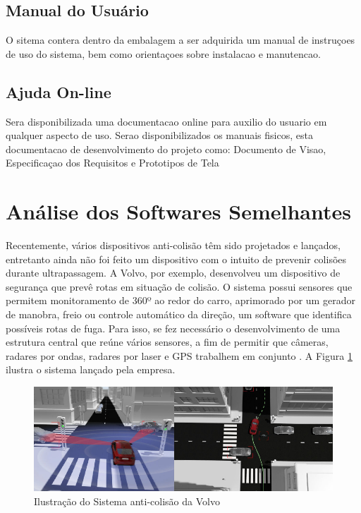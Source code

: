 \subsection{Manual do Usuário}
O sitema contera dentro da embalagem a ser adquirida um manual de instruçoes de uso do sistema, bem como orientaçoes sobre instalacao e manutencao.

\subsection{Ajuda On-line}
Sera disponibilizada uma documentacao online para auxilio do usuario em qualquer aspecto de uso. Serao disponibilizados os manuais fisicos, esta documentacao de desenvolvimento do projeto como: Documento de Visao, Especificaçao dos Requisitos e Prototipos de Tela

\section{Análise dos Softwares Semelhantes}
Recentemente, vários dispositivos anti-colisão têm sido projetados e lançados, entretanto ainda não foi feito um dispositivo com o intuito
de prevenir colisões durante ultrapassagem. A Volvo, por exemplo, desenvolveu um dispositivo de segurança que prevê rotas em situação de
colisão. O sistema possui sensores que permitem monitoramento de 360º ao redor do carro, aprimorado por um gerador de manobra, freio ou controle
automático da direção, um software que identifica possíveis rotas de fuga. Para isso, se fez necessário o desenvolvimento de uma estrutura central
que reúne vários sensores, a fim de permitir que câmeras, radares por ondas, radares por laser e GPS trabalhem em conjunto \cite{volvo}. A
 Figura \ref{fig:sistemavolvo} ilustra
 o sistema lançado pela empresa.

 \begin{figure}[h]
   \centering

   \includegraphics[width=450px, scale=1]{figuras/sistemavolvo}
   \caption{Ilustração do Sistema anti-colisão da Volvo}

\label{fig:sistemavolvo}
 \end{figure}


